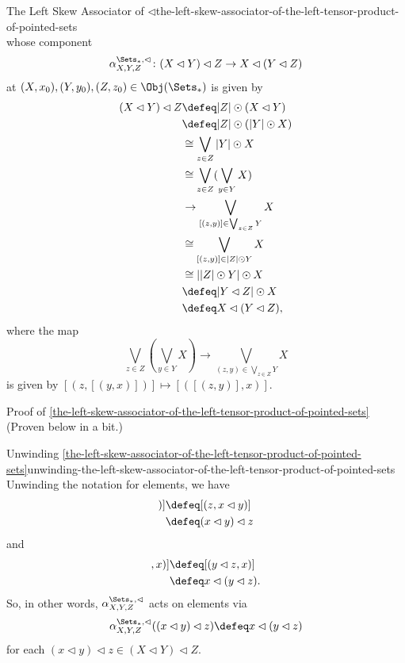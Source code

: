 \begin{definition}{The Left Skew Associator of $\lhd$}{the-left-skew-associator-of-the-left-tensor-product-of-pointed-sets}
\[    \]%
    whose component
    \[
        \alpha^{\Sets_{*},\lhd}_{X,Y,Z}
        \colon
        (X\lhd Y)\lhd Z
        \to
        X\lhd(Y\lhd Z)
    \]%
    at $(X,x_{0}),(Y,y_{0}),(Z,z_{0})\in\Obj(\Sets_{*})$ is given by
    \begin{align*}
        (X\lhd Y)\lhd Z &\defeq |Z|\odot(X\lhd Y)\\
                        &\defeq |Z|\odot(|Y|\odot X)\\
                        &\cong  \bigvee_{z\in Z}|Y|\odot X\\
                        &\cong  \bigvee_{z\in Z}(\bigvee_{y\in Y}X)\\
                        &\to    \bigvee_{[(z,y)]\in\bigvee_{z\in Z}Y}X\\
                        &\cong  \bigvee_{[(z,y)]\in|Z|\odot Y}X\\
                        &\cong  ||Z|\odot Y|\odot X\\
                        &\defeq |Y\lhd Z|\odot X\\
                        &\defeq X\lhd(Y\lhd Z),%
    \end{align*}
    where the map%
    \[
        \bigvee_{z\in Z}(\bigvee_{y\in Y}X)%
        \to%
        \bigvee_{(z,y)\in\bigvee_{z\in Z}Y}X%
    \]%
    is given by $[(z,[(y,x)])]\mapsto[([(z,y)],x)]$.
\end{definition}
\begin{Proof}{Proof of \cref{the-left-skew-associator-of-the-left-tensor-product-of-pointed-sets}}%
    (Proven below in a bit.)
\end{Proof}
\begin{remark}{Unwinding \cref{the-left-skew-associator-of-the-left-tensor-product-of-pointed-sets}}{unwinding-the-left-skew-associator-of-the-left-tensor-product-of-pointed-sets}%
    Unwinding the notation for elements, we have
    \begin{align*}
        [(z,[(y,x)])] &\defeq [(z,x\lhd y)]\\
                      &\defeq (x\lhd y)\lhd z
    \end{align*}
    and
    \begin{align*}
        [([(z,y)],x)] &\defeq [(y\lhd z,x)]\\
                      &\defeq x\lhd(y\lhd z).
    \end{align*}
    So, in other words, $\alpha^{\Sets_{*},\lhd}_{X,Y,Z}$ acts on elements via
    \[
        \alpha^{\Sets_{*},\lhd}_{X,Y,Z}((x\lhd y)\lhd z)
        \defeq
        x\lhd(y\lhd z)
    \]%
    for each $(x\lhd y)\lhd z\in(X\lhd Y)\lhd Z$.
\end{remark}
